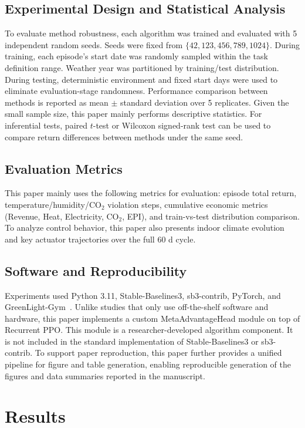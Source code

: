 \documentclass[number,preprint,review,12pt]{elsarticle}
\begin{document}
\subsection{Experimental Design and Statistical Analysis}
To evaluate method robustness, each algorithm was trained and evaluated with 5 independent random seeds. Seeds were fixed from $\{42, 123, 456, 789, 1024\}$. During training, each episode's start date was randomly sampled within the task definition range. Weather year was partitioned by training/test distribution. During testing, deterministic environment and fixed start days were used to eliminate evaluation-stage randomness. Performance comparison between methods is reported as mean $\pm$ standard deviation over 5 replicates. Given the small sample size, this paper mainly performs descriptive statistics. For inferential tests, paired $t$-test or Wilcoxon signed-rank test can be used to compare return differences between methods under the same seed.

\subsection{Evaluation Metrics}
This paper mainly uses the following metrics for evaluation: episode total return, temperature/humidity/CO$_2$ violation steps, cumulative economic metrics (Revenue, Heat, Electricity, CO$_2$, EPI), and train-vs-test distribution comparison. To analyze control behavior, this paper also presents indoor climate evolution and key actuator trajectories over the full 60 d cycle.

\subsection{Software and Reproducibility}
Experiments used Python 3.11, Stable-Baselines3, sb3-contrib, PyTorch, and GreenLight-Gym~\cite{sb3,recurrentppo,van2025greenlight,brockman2016gym,paszke2019pytorch,taksen2024gymnasium}. Unlike studies that only use off-the-shelf software and hardware, this paper implements a custom MetaAdvantageHead module on top of Recurrent PPO. This module is a researcher-developed algorithm component. It is not included in the standard implementation of Stable-Baselines3 or sb3-contrib. To support paper reproduction, this paper further provides a unified pipeline for figure and table generation, enabling reproducible generation of the figures and data summaries reported in the manuscript.

\section{Results}
\end{document}
